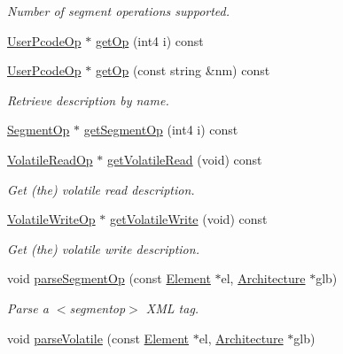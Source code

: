 \begin{DoxyCompactItemize}
\begin{DoxyCompactList}\small\item\em Number of segment operations supported. \end{DoxyCompactList}\item 
\mbox{\hyperlink{class_user_pcode_op}{User\+Pcode\+Op}} $\ast$ \mbox{\hyperlink{class_user_op_manage_a20d645319fc3912640bec7113c11818d}{get\+Op}} (int4 i) const
\item 
\mbox{\hyperlink{class_user_pcode_op}{User\+Pcode\+Op}} $\ast$ \mbox{\hyperlink{class_user_op_manage_a305893145a3e799d4d97936296698bfb}{get\+Op}} (const string \&nm) const
\begin{DoxyCompactList}\small\item\em Retrieve description by name. \end{DoxyCompactList}\item 
\mbox{\hyperlink{class_segment_op}{Segment\+Op}} $\ast$ \mbox{\hyperlink{class_user_op_manage_a59f67a150f53117fc159be3e66721640}{get\+Segment\+Op}} (int4 i) const
\item 
\mbox{\hyperlink{class_volatile_read_op}{Volatile\+Read\+Op}} $\ast$ \mbox{\hyperlink{class_user_op_manage_a200fcd7fcd664e36bb390509170cd4f6}{get\+Volatile\+Read}} (void) const
\begin{DoxyCompactList}\small\item\em Get (the) volatile read description. \end{DoxyCompactList}\item 
\mbox{\hyperlink{class_volatile_write_op}{Volatile\+Write\+Op}} $\ast$ \mbox{\hyperlink{class_user_op_manage_a4ab2f5390f4f289a39328737615dce57}{get\+Volatile\+Write}} (void) const
\begin{DoxyCompactList}\small\item\em Get (the) volatile write description. \end{DoxyCompactList}\item 
void \mbox{\hyperlink{class_user_op_manage_ab6ce4b3d4fb3046930b47b1e94c2131d}{parse\+Segment\+Op}} (const \mbox{\hyperlink{class_element}{Element}} $\ast$el, \mbox{\hyperlink{class_architecture}{Architecture}} $\ast$glb)
\begin{DoxyCompactList}\small\item\em Parse a $<$segmentop$>$ X\+ML tag. \end{DoxyCompactList}\item 
void \mbox{\hyperlink{class_user_op_manage_a643a087e70166f5e914673476c9189ba}{parse\+Volatile}} (const \mbox{\hyperlink{class_element}{Element}} $\ast$el, \mbox{\hyperlink{class_architecture}{Architecture}} $\ast$glb)

\end{DoxyCompactItemize}
